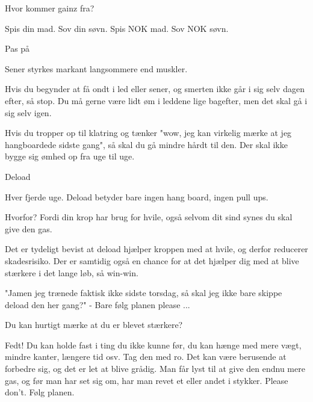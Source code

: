 \begin{multicols}{2}
  \begin{tList}{Hvor kommer gainz fra?}
  \item Spis din mad. Sov din søvn. Spis NOK mad. Sov NOK søvn.
  \end{tList}

  \begin{tList}{Pas på}
  \item Sener styrkes markant langsommere end muskler.

  \item Hvis du begynder at få ondt i led eller sener, og smerten
    ikke går i sig selv dagen efter, så stop. Du må gerne være lidt
    øm i leddene lige bagefter, men det skal gå i sig selv igen.

  \item Hvis du tropper op til klatring og tænker "wow, jeg kan
    virkelig mærke at jeg hangboardede sidste gang", så skal du gå
    mindre hårdt til den. Der skal ikke bygge sig ømhed op fra uge til uge.
  \end{tList}

  \begin{tList}{Deload}

  \item Hver fjerde uge. Deload betyder bare ingen hang board, ingen pull ups.

  \item Hvorfor?
    Fordi din krop har brug for hvile, også selvom dit sind synes
    du skal give den gas.

  \item Det er tydeligt bevist at deload hjælper kroppen med at
    hvile, og derfor reducerer skadesrisiko. Der er samtidig også en
    chance for at det hjælper dig med at blive stærkere i det lange
    løb, så win-win.

  \item "Jamen jeg trænede faktisk ikke sidste torsdag, så skal jeg
    ikke bare skippe deload den her gang?"
    - Bare følg planen please ...
  \end{tList}

  \begin{tList}{Du kan hurtigt mærke at du er blevet stærkere?}
  \item   Fedt! Du kan holde
    fast i ting du ikke kunne før, du kan hænge med mere vægt, mindre
    kanter, længere tid osv. Tag den med ro. Det kan være berusende at
    forbedre sig, og det er let at blive grådig. Man får lyst til at
    give den endnu mere gas, og før man har set sig om, har man revet
    et eller andet i stykker. Please don't. Følg planen.
  \end{tList}
\end{multicols}
